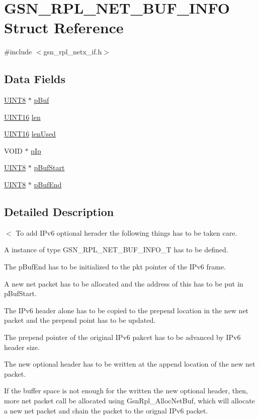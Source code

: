 \hypertarget{a00207}{
\section{GSN\_\-RPL\_\-NET\_\-BUF\_\-INFO Struct Reference}
\label{a00207}
}


{\ttfamily \#include $<$gsn\_\-rpl\_\-netx\_\-if.h$>$}

\subsection*{Data Fields}
\begin{DoxyCompactItemize}
\item 
\hyperlink{a00660_gab27e9918b538ce9d8ca692479b375b6a}{UINT8} $\ast$ \hyperlink{a00207_a9d6f28faefcf4436d36ac3e698e1ce50}{pBuf}
\item 
\hyperlink{a00660_ga09f1a1fb2293e33483cc8d44aefb1eb1}{UINT16} \hyperlink{a00207_ab3bcead9c261261394a5d9b3bf8f95cb}{len}
\item 
\hyperlink{a00660_ga09f1a1fb2293e33483cc8d44aefb1eb1}{UINT16} \hyperlink{a00207_a30d3105211b3a23fe982def9305f4c40}{lenUsed}
\item 
VOID $\ast$ \hyperlink{a00207_a034966600aedf93f9197ac55b467812a}{pIp}
\item 
\hyperlink{a00660_gab27e9918b538ce9d8ca692479b375b6a}{UINT8} $\ast$ \hyperlink{a00207_a714cd2aa6239909d5ceaf8b1e62f2f78}{pBufStart}
\item 
\hyperlink{a00660_gab27e9918b538ce9d8ca692479b375b6a}{UINT8} $\ast$ \hyperlink{a00207_aed7b3a60a222f1e6c2e1207b2d05aef7}{pBufEnd}
\end{DoxyCompactItemize}


\subsection{Detailed Description}
$<$ To add IPv6 optional herader the following things has to be taken care.
\begin{DoxyItemize}
\item A instance of type GSN\_\-RPL\_\-NET\_\-BUF\_\-INFO\_\-T has to be defined.
\item The pBufEnd has to be initialized to the pkt pointer of the IPv6 frame.
\item A new net packet has to be allocated and the address of this has to be put in pBufStart.
\item The IPv6 header alone has to be copied to the prepend location in the new net packet and the prepend point has to be updated.
\item The prepend pointer of the original IPv6 pakcet has to be advanced by IPv6 header size.
\item The new optional header has to be written at the append location of the new net packet.
\item If the buffer space is not enough for the written the new optional header, then, more net packet call be allocated using GsnRpl\_\-AllocNetBuf, which will allocate a new net packet and chain the packet to the orignal IPv6 packet.
\end{DoxyItemize}

